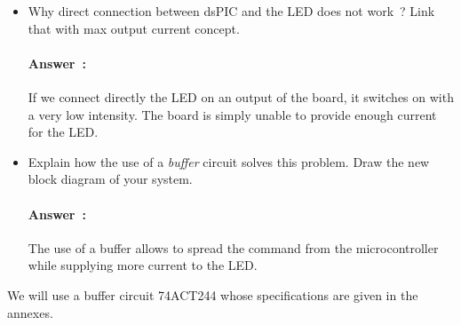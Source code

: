 \documentclass[11pt,a4paper]{article}
\theoremstyle{definition}%
\newcommand{\reponse}[1]{%
	\ifthenelse {\boolean{corrige}} {\paragraph{Answer~:} \color{darkblue}   #1\color{black}} {}
 }
\begin{document}


\begin{itemize}
	\item Why direct connection between dsPIC and the LED does not work~?
	Link that with max output current concept.
	\reponse{
        If we connect directly the LED on an output of the board, it switches on with a very low intensity. The board is simply unable to provide enough current for the LED.
	}
	\item Explain how the use of a \textit{buffer} circuit solves this problem.
	Draw the new block diagram of your system.
	\reponse{
		The use of a buffer allows to spread the command from the microcontroller while supplying more current to the LED.
	}
\end{itemize}
We will use a buffer circuit 74ACT244 whose specifications are given in the annexes.

\end{document}
